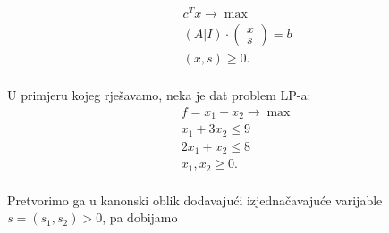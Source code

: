 \documentclass[a4paper, utf8, 11pt, colorlinks]{book}
\begin{document}
\begin{align}
    & c^T x \rightarrow \max \\
    & (A | I) \cdot \left (\begin{array}{c}
         x  \\
         s 
    \end{array} \right ) =  b \\
    & (x, s) \geq 0. \\
\end{align} 

U primjeru kojeg rješavamo, neka je dat problem LP-a:
\begin{align*}
    &f= x_1 + x_2 \rightarrow \max \nonumber \\
    & x_1 + 3 x_2 \leq 9 \nonumber \\
    & 2x_1 + x_2 \leq 8  \nonumber \\
    & x_1, x_2 \geq 0. \nonumber \\
\end{align*}
 
 Pretvorimo ga u kanonski oblik dodavajući izjednačavajuće varijable $s = (s_1, s_2)>0$, pa dobijamo 
\end{document}
